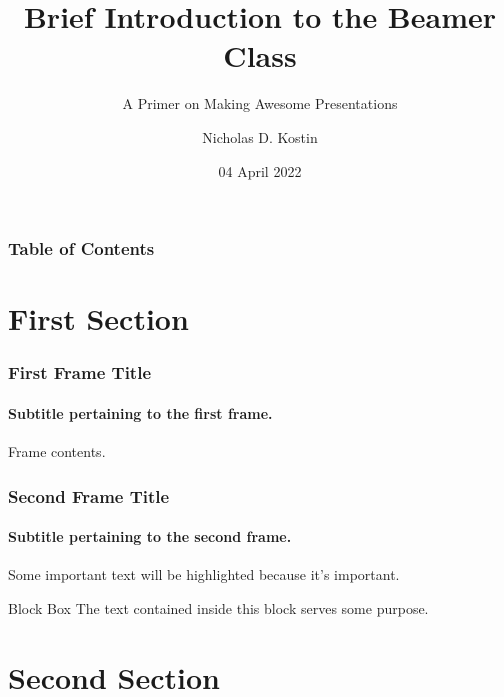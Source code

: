 \documentclass[aspectratio=169]{beamer}
\title{Brief Introduction to the Beamer Class}
\subtitle{A Primer on Making Awesome Presentations}
\author{Nicholas D. Kostin}
\date{04 April 2022}
\numberwithin{equation}{section}
\begin{document}
\frame{\titlepage}

\begin{frame}
    \frametitle{Table of Contents}
    \tableofcontents
\end{frame}

\section{First Section}

\begin{frame}
\frametitle{First Frame Title}
\framesubtitle{Subtitle pertaining to the first frame.}

Frame contents.

\end{frame}

\begin{frame}
\frametitle{Second Frame Title}
\framesubtitle{Subtitle pertaining to the second frame.}

Some important text will be \alert{highlighted} because it's important.

\vfill

\begin{block}{Block Box}
    The text contained inside this block serves some purpose.
\end{block}

\end{frame}

\section{Second Section}
\end{document}
